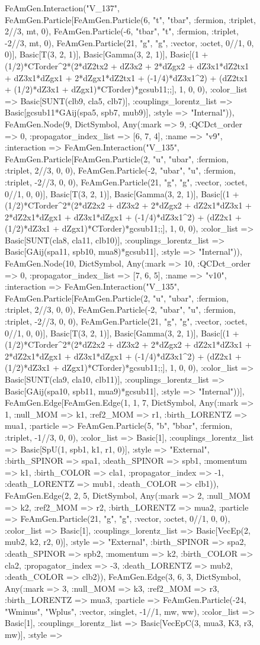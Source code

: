 \documentclass{revtex4}
\begin{document}
\begin{figure}[!htb]
\begin{center}
{FeAmGen.Interaction("V_137", FeAmGen.Particle[FeAmGen.Particle(6, "t", "tbar", :fermion, :triplet, 2//3, mt, 0), FeAmGen.Particle(-6, "tbar", "t", :fermion, :triplet, -2//3, mt, 0), FeAmGen.Particle(21, "g", "g", :vector, :octet, 0//1, 0, 0)], Basic[T(3, 2, 1)], Basic[Gamma(3, 2, 1)], Basic[(1 + (1/2)*CTorder^2*(2*dZ2tx2 + dZ3x2 + 2*dZgx2 + dZ3x1*dZ2tx1 + dZ3x1*dZgx1 + 2*dZgx1*dZ2tx1 + (-1/4)*dZ3x1^2) + (dZ2tx1 + (1/2)*dZ3x1 + dZgx1)*CTorder)*gcsub11;;], 1, 0, 0), :color_list => Basic[SUNT(clb9, cla5, clb7)], :couplings_lorentz_list => Basic[gcsub11*GAij(spa5, spb7, mub9)], :style => "Internal")), FeAmGen.Node(9, Dict{Symbol, Any}(:mark => 9, :QCDct_order => 0, :propagator_index_list => [6, 7, 4], :name => "v9", :interaction => FeAmGen.Interaction("V_135", FeAmGen.Particle[FeAmGen.Particle(2, "u", "ubar", :fermion, :triplet, 2//3, 0, 0), FeAmGen.Particle(-2, "ubar", "u", :fermion, :triplet, -2//3, 0, 0), FeAmGen.Particle(21, "g", "g", :vector, :octet, 0//1, 0, 0)], Basic[T(3, 2, 1)], Basic[Gamma(3, 2, 1)], Basic[(1 + (1/2)*CTorder^2*(2*dZ2x2 + dZ3x2 + 2*dZgx2 + dZ2x1*dZ3x1 + 2*dZ2x1*dZgx1 + dZ3x1*dZgx1 + (-1/4)*dZ3x1^2) + (dZ2x1 + (1/2)*dZ3x1 + dZgx1)*CTorder)*gcsub11;;], 1, 0, 0), :color_list => Basic[SUNT(cla8, cla11, clb10)], :couplings_lorentz_list => Basic[GAij(spa11, spb10, mua8)*gcsub11], :style => "Internal")), FeAmGen.Node(10, Dict{Symbol, Any}(:mark => 10, :QCDct_order => 0, :propagator_index_list => [7, 6, 5], :name => "v10", :interaction => FeAmGen.Interaction("V_135", FeAmGen.Particle[FeAmGen.Particle(2, "u", "ubar", :fermion, :triplet, 2//3, 0, 0), FeAmGen.Particle(-2, "ubar", "u", :fermion, :triplet, -2//3, 0, 0), FeAmGen.Particle(21, "g", "g", :vector, :octet, 0//1, 0, 0)], Basic[T(3, 2, 1)], Basic[Gamma(3, 2, 1)], Basic[(1 + (1/2)*CTorder^2*(2*dZ2x2 + dZ3x2 + 2*dZgx2 + dZ2x1*dZ3x1 + 2*dZ2x1*dZgx1 + dZ3x1*dZgx1 + (-1/4)*dZ3x1^2) + (dZ2x1 + (1/2)*dZ3x1 + dZgx1)*CTorder)*gcsub11;;], 1, 0, 0), :color_list => Basic[SUNT(cla9, cla10, clb11)], :couplings_lorentz_list => Basic[GAij(spa10, spb11, mua9)*gcsub11], :style => "Internal"))], FeAmGen.Edge[FeAmGen.Edge(1, 1, 7, Dict{Symbol, Any}(:mark => 1, :null_MOM => k1, :ref2_MOM => r1, :birth_LORENTZ => mua1, :particle => FeAmGen.Particle(5, "b", "bbar", :fermion, :triplet, -1//3, 0, 0), :color_list => Basic[1], :couplings_lorentz_list => Basic[SpU(1, spb1, k1, r1, 0)], :style => "External", :birth_SPINOR => spa1, :death_SPINOR => spb1, :momentum => k1, :birth_COLOR => cla1, :propagator_index => -1, :death_LORENTZ => mub1, :death_COLOR => clb1)), FeAmGen.Edge(2, 2, 5, Dict{Symbol, Any}(:mark => 2, :null_MOM => k2, :ref2_MOM => r2, :birth_LORENTZ => mua2, :particle => FeAmGen.Particle(21, "g", "g", :vector, :octet, 0//1, 0, 0), :color_list => Basic[1], :couplings_lorentz_list => Basic[VecEp(2, mub2, k2, r2, 0)], :style => "External", :birth_SPINOR => spa2, :death_SPINOR => spb2, :momentum => k2, :birth_COLOR => cla2, :propagator_index => -3, :death_LORENTZ => mub2, :death_COLOR => clb2)), FeAmGen.Edge(3, 6, 3, Dict{Symbol, Any}(:mark => 3, :null_MOM => k3, :ref2_MOM => r3, :birth_LORENTZ => mua3, :particle => FeAmGen.Particle(-24, "Wminus", "Wplus", :vector, :singlet, -1//1, mw, ww), :color_list => Basic[1], :couplings_lorentz_list => Basic[VecEpC(3, mua3, K3, r3, mw)], :style => }
\end{center}
\end{figure}
\end{document}
